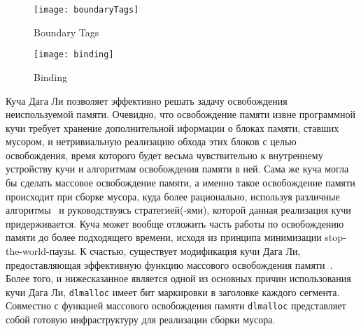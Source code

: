 \begin{figure}[h!]
	\centering
	\texttt{[image: boundaryTags]}
	\caption{Boundary Tags}
	\centering
	\texttt{[image: binding]}
	\caption{Binding}
\end{figure}

Куча Дага Ли позволяет эффективно решать задачу освобождения неиспользуемой памяти.
Очевидно, что освобождение памяти извне программной кучи требует хранение дополнительной иформации о блоках памяти,
ставших мусором, и нетривиальную реализацию обхода этих блоков с целью освобождения, время которого будет весьма
чувствительно к внутреннему устройству кучи и алгоритмам освобождения памяти в ней.
Сама же куча могла бы сделать массовое освобождение памяти, а именно такое освобождение памяти происходит при сборке мусора,
куда более рационально, используя различные алгоритмы~\cite{GCBook}
и руководствуясь стратегией(-ями), которой данная реализация кучи придерживается.
Куча может вообще отложить часть работы по освобождению памяти до более подходящего времени,
исходя из принципа минимизации stop-the-world-паузы.
К счастью, существует модификация кучи Дага Ли,
предоставляющая эффективную функцию массового освобождения памяти~\cite{msmalloc}.
Более того, и нижесказанное является одной из основных причин использования кучи Дага Ли,
\lstinline[language= cpp]{dlmalloc} имеет бит маркировки в заголовке каждого сегмента. Совместно с функцией массового освобождения
памяти \lstinline[language= cpp]{dlmalloc} представляет собой готовую инфраструктуру для реализации сборки мусора.

